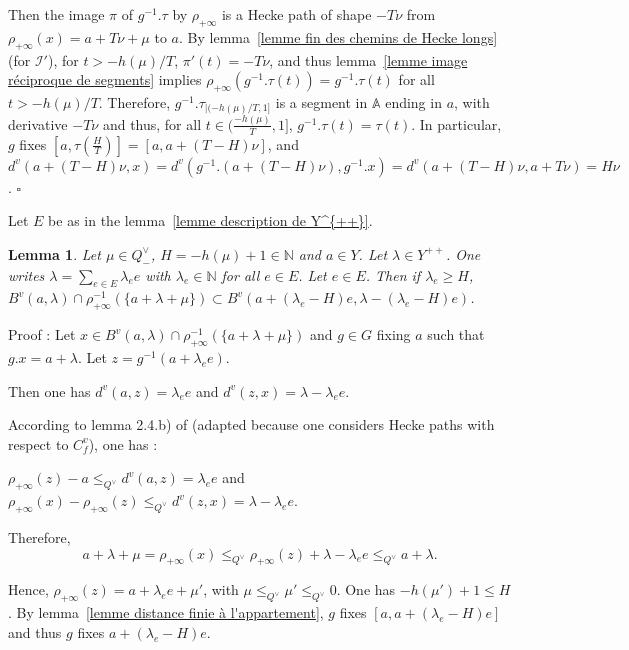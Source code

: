\documentclass[12pt]{article}
\theoremstyle{plain}
\newtheorem{lemme}[thm]{Lemma}
\theoremstyle{definition}
\newcommand{\A}{\mathbb{A}}
\newcommand{\N}{\mathbb{N}}
\newcommand{\I}{\mathcal{I}}
\begin{document}
Then the image $\pi$ of $g^{-1}.\tau$ by $\rho_{+\infty}$ is a Hecke path of shape $-T\nu$ from $\rho_{+\infty}(x)=a+T\nu +\mu$ to $a$. By lemma~\ref{lemme fin des chemins de Hecke longs} (for $\I'$), for $t>-h(\mu)/T$, $\pi'(t)=-T\nu$, and thus lemma~\ref{lemme image réciproque de segments} implies $\rho_{+\infty}(g^{-1}.\tau(t))=g^{-1}.\tau(t)$ for all $t>-h(\mu)/T$. Therefore, $g^{-1}.\tau_{|(-h(\mu)/T,1]}$ is a segment in $\A$ ending in $a$, with derivative $-T\nu$ and thus, for all $t\in (\frac{-h(\mu)}{T},1]$, $g^{-1}.\tau(t)=\tau(t)$.
 In particular, $g$ fixes $[a,\tau(\frac{H}{T})]=[a,a+(T-H)\nu]$, and $d^v(a+(T-H)\nu,x)=d^v(g^{-1}.(a+(T-H)\nu),g^{-1}.x)=d^v(a+(T-H)\nu,a+T\nu)=H\nu$. $\square$











\vspace{5mm}

Let $E$ be as in the lemma~\ref{lemme description de Y^{++}}. 
 
 
\begin{lemme}\label{lemme distance finie à l'appartement bis}
Let $\mu\in Q^\vee_-$, $H=-h(\mu)+1\in \N$ and $a\in Y$. Let $\lambda\in Y^{++}$. One writes $\lambda=\sum_{e\in E}\lambda_e e$ with $\lambda_e\in\N$ for all $e\in E$. Let $e\in E$. Then if $\lambda_e\geq H$, $B^v(a,\lambda)\cap\rho_{+\infty}^{-1}(\{a+\lambda+\mu\})\subset B^v(a+(\lambda_e -H)e,\lambda-(\lambda_e-H)e)$. 
\end{lemme} 

Proof : Let $x\in B^v(a,\lambda)\cap\rho_{+\infty}^{-1}(\{a+\lambda+\mu\})$ and $g\in G$ fixing $a$ such that $g.x=a+\lambda$.  Let $z=g^{-1}(a+\lambda_e e)$.

Then one has $d^v(a,z)=\lambda_e e$ and $d^v(z,x)=\lambda-\lambda_e e$.

According to lemma 2.4.b) of \cite{gaussent2014spherical} (adapted because one considers Hecke paths with respect to $C^v_f$), one has : 

$\rho_{+\infty}(z)-a\leq_{Q^\vee} d^v(a,z)=\lambda_e e$ and $\rho_{+\infty}(x)-\rho_{+\infty}(z)\leq_{Q^\vee} d^v(z,x)=\lambda-\lambda_e e$.

Therefore, \[a+\lambda+\mu=\rho_{+\infty}(x)\leq_{Q^\vee} \rho_{+\infty}(z)+\lambda-\lambda_e e\leq_{Q^\vee}a+\lambda.\]

Hence, $\rho_{+\infty}(z)=a+\lambda_e e+\mu'$, with $\mu\leq_{Q^\vee}\mu'\leq_{Q^\vee}0$. One has $-h(\mu')+1\leq H$. By lemma~\ref{lemme distance finie à l'appartement}, $g$ fixes $[a,a+(\lambda_e-H)e]$ and thus $g$ fixes $a+(\lambda_e-H)e$. 
\end{document}
